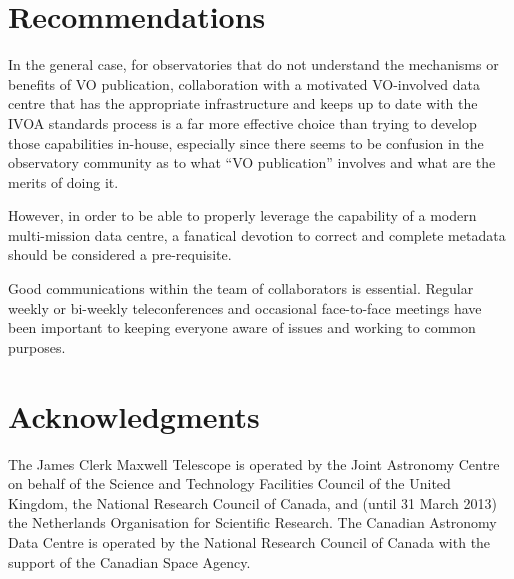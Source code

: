 \documentclass[final,authoryear,5p,times,twocolumn]{elsarticle}
\begin{document}
\section{Recommendations}

In the general case, for observatories that do not understand the
mechanisms or benefits of VO publication, collaboration with a
motivated VO-involved data centre that has the appropriate
infrastructure and keeps up to date with the IVOA standards process is
a far more effective choice than trying to develop those capabilities
in-house, especially since there seems to be confusion in the
observatory community as to what ``VO publication'' involves and what
are the merits of doing it.

However, in order to be able to properly leverage the capability of a
modern multi-mission data centre, a fanatical devotion to correct and
complete metadata should be considered a pre-requisite.

{\color{red}
Good communications within the team of collaborators is essential.  Regular
weekly or bi-weekly teleconferences and occasional face-to-face meetings
have been important to keeping everyone aware of issues and working to
common purposes.
}

\section*{Acknowledgments}

The James Clerk Maxwell Telescope is operated by the Joint Astronomy
Centre on behalf of the Science and Technology Facilities Council of
the United Kingdom, the National Research Council of Canada, and
(until 31 March 2013) the Netherlands Organisation for Scientific
Research.  The Canadian Astronomy Data Centre is operated by the
National Research Council of Canada with the support of the Canadian
Space Agency.
\end{document}
